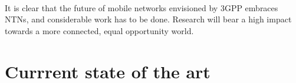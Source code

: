 \paragraph{}
It is clear that the future of mobile networks envisioned by \ac{3GPP} embraces \ac{NTN}s, and considerable work has to be done. Research will bear a high impact towards a more connected, equal opportunity world. 

\section{Currrent state of the art}
